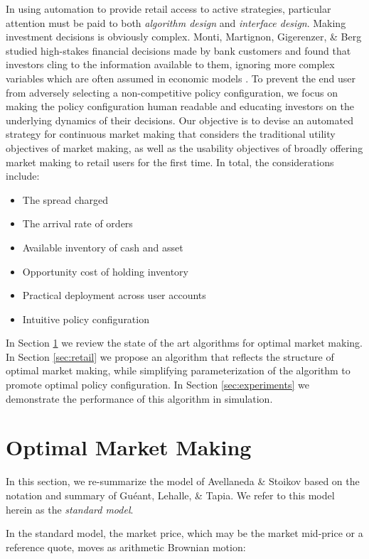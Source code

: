 \documentclass{article}
\begin{document}
In using automation to provide retail access to active strategies, particular attention must be paid to both \emph{algorithm design} and \emph{interface design}. Making investment decisions is obviously complex. Monti, Martignon, Gigerenzer, \& Berg studied high-stakes financial decisions made by bank customers and found that investors cling to the information available to them, ignoring more complex variables which are often assumed in economic models \cite{monti2009impact}. To prevent the end user from adversely selecting a non-competitive policy configuration, we focus on making the policy configuration human readable and educating investors on the underlying dynamics of their decisions. Our objective is to devise an automated strategy for continuous market making that considers the traditional utility objectives of market making, as well as the usability objectives of broadly offering market making to retail users for the first time. In total, the considerations include:

\begin{itemize}
  \item The spread charged
  \item The arrival rate of orders
  \item Available inventory of cash and asset
  \item Opportunity cost of holding inventory
  \item Practical deployment across user accounts
  \item Intuitive policy configuration
\end{itemize}

In Section \ref{sec:optimal} we review the state of the art algorithms for optimal market making. In Section \ref{sec:retail} we propose an algorithm that reflects the structure of optimal market making, while simplifying parameterization of the algorithm to promote optimal policy configuration. In Section \ref{sec:experiments} we demonstrate the performance of this algorithm in simulation.

\section{Optimal Market Making}
\label{sec:optimal}

In this section, we re-summarize the model of Avellaneda \& Stoikov based on the notation and summary of Guéant, Lehalle, \& Tapia. We refer to this model herein as the \emph{standard model}.

In the standard model, the market price, which may be the market mid-price or a reference quote, moves as arithmetic Brownian motion:
\end{document}
